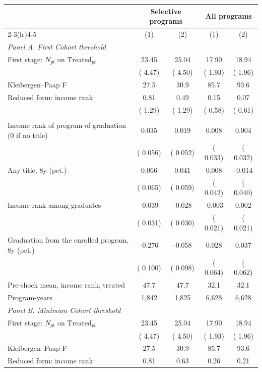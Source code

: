 \begin{tabular}{lcccc}
\toprule
 & \multicolumn{2}{c}{Selective programs} & \multicolumn{2}{c}{All programs} \\
\cmidrule(lr){2-3}\cmidrule(lr){4-5}
 & (1) & (2) & (1) & (2) \\
\midrule
\multicolumn{5}{l}{\textit{Panel A. First Cohort threshold}} \\
First stage: \(N_{pt}\) on \(\text{Treated}_{pt}\) &  23.45 &  25.04 &  17.90 &  18.94 \\
 & (  4.47) & (  4.50) & (  1.93) & (  1.96) \\
Kleibergen--Paap F &   27.5 &   30.9 &   85.7 &   93.6 \\
\addlinespace
Reduced form: income rank &   0.81 &   0.49 &   0.15 &   0.07 \\
 & (  1.29) & (  1.29) & (  0.58) & (  0.61) \\
\addlinespace
\multicolumn{5}{l}{2SLS, per additional entrant} \\
\quad Income rank of program of graduation (0 if no title) &  0.035 &  0.019 &  0.008 &  0.004 \\
 & ( 0.056) & ( 0.052) & ( 0.033) & ( 0.032) \\
\quad Any title, 8y (pct.) &  0.066 &  0.041 &  0.008 & -0.014 \\
 & ( 0.065) & ( 0.059) & ( 0.042) & ( 0.040) \\
\quad Income rank among graduates & -0.039 & -0.028 & -0.003 &  0.002 \\
 & ( 0.031) & ( 0.030) & ( 0.021) & ( 0.021) \\
\quad Graduation from the enrolled program, 8y (pct.) & -0.276\sym{***} & -0.058 &  0.028 &  0.037 \\
 & ( 0.100) & ( 0.098) & ( 0.064) & ( 0.062) \\
\addlinespace
Pre-shock mean, income rank, treated &  47.7 &  47.7 &  32.1 &  32.1 \\
Program-years &  1,842 &  1,825 &  6,628 &  6,628 \\
\midrule
\multicolumn{5}{l}{\textit{Panel B. Minimum Cohort threshold}} \\
First stage: \(N_{pt}\) on \(\text{Treated}_{pt}\) &  23.45 &  25.04 &  17.90 &  18.94 \\
 & (  4.47) & (  4.50) & (  1.93) & (  1.96) \\
Kleibergen--Paap F &   27.5 &   30.9 &   85.7 &   93.6 \\
\addlinespace
Reduced form: income rank &   0.81 &   0.63 &   0.26 &   0.21 \\

\end{tabular}

